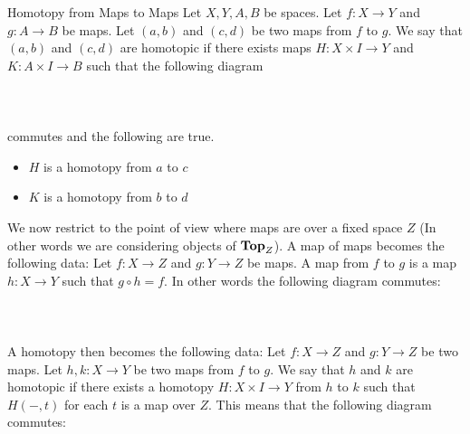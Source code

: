 \documentclass[a4paper]{article}
\begin{document}
\begin{defn}{Homotopy from Maps to Maps}{} Let $X,Y,A,B$ be spaces. Let $f:X\to Y$ and $g:A\to B$ be maps. Let $(a,b)$ and $(c,d)$ be two maps from $f$ to $g$. We say that $(a,b)$ and $(c,d)$ are homotopic if there exists maps $H:X\times I\to Y$ and $K:A\times I\to B$ such that the following diagram \\~\\
\\~\\
commutes and the following are true. 
\begin{itemize}
\item $H$ is a homotopy from $a$ to $c$
\item $K$ is a homotopy from $b$ to $d$
\end{itemize}
\end{defn}

We now restrict to the point of view where maps are over a fixed space $Z$ (In other words we are considering objects of $\bold{Top}_Z$). A map of maps becomes the following data: Let $f:X\to Z$ and $g:Y\to Z$ be maps. A map from $f$ to $g$ is a map $h:X\to Y$ such that $g\circ h=f$. In other words the following diagram commutes: \\~\\
\\~\\

A homotopy then becomes the following data: Let $f:X\to Z$ and $g:Y\to Z$ be two maps. Let $h,k:X\to Y$ be two maps from $f$ to $g$. We say that $h$ and $k$ are homotopic if there exists a homotopy $H:X\times I\to Y$ from $h$ to $k$ such that $H(-,t)$ for each $t$ is a map over $Z$. This means that the following diagram commutes: \\~\\
\\~\\
\end{document}
